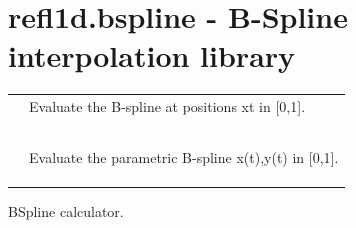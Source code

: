 \documentclass[letterpaper,10pt,english]{sphinxmanual}
\begin{document}
\section{refl1d.bspline - B-Spline interpolation library}
\label{api/bspline::doc}\label{api/bspline:refl1d-bspline-b-spline-interpolation-library}
\begin{tabulary}{\linewidth}{LL}
\hline

{\hyperref[api/bspline:refl1d.bspline.bspline]{}}
 & 
Evaluate the B-spline at positions xt in {[}0,1{]}.
\\

{\hyperref[api/bspline:refl1d.bspline.bspline_control]{}}
 & 

\\

{\hyperref[api/bspline:refl1d.bspline.demo]{}}
 & 

\\

{\hyperref[api/bspline:refl1d.bspline.demo_interp]{}}
 & 

\\

{\hyperref[api/bspline:refl1d.bspline.max]{}}
 & 

\\

{\hyperref[api/bspline:refl1d.bspline.min]{}}
 & 

\\

{\hyperref[api/bspline:refl1d.bspline.pbs]{}}
 & 
Evaluate the parametric B-spline x(t),y(t) in {[}0,1{]}.
\\

{\hyperref[api/bspline:refl1d.bspline.pbs_control]{}}
 & 

\\

{\hyperref[api/bspline:refl1d.bspline.speed_check]{}}
 & 

\\

{\hyperref[api/bspline:refl1d.bspline.test]{}}
 & 

\\
\hline
\end{tabulary}

\label{api/bspline:module-refl1d.bspline}
BSpline calculator.
\end{document}
